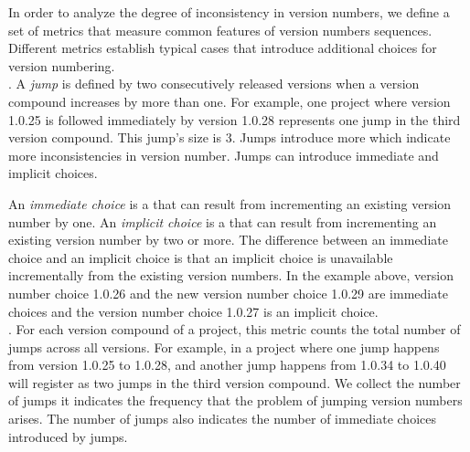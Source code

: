 \documentclass[conference]{IEEEtran}
\begin{document}
In order to analyze the degree of inconsistency in version numbers, we define 
a set of metrics that measure common features of version numbers sequences. Different metrics establish typical cases that introduce additional choices for version numbering. \\
 
 
 
 
. A \emph{jump} is defined by two consecutively released versions when a version compound increases by more than one.
For example, one project where version 1.0.25 is followed immediately by version 1.0.28 represents one jump in the third version compound. This jump's size is 3. Jumps introduce more \choices which indicate more inconsistencies in version number. 
Jumps can introduce immediate and implicit choices.

An \emph{immediate choice} is a \choice that can result from incrementing an existing version number by one. 
An \emph{implicit choice} is a \choice that can result from incrementing an existing version number by two or more.
The difference between an immediate choice and an implicit choice is that an implicit choice is unavailable incrementally from the existing version numbers. 
In the example above, version number choice 1.0.26 and the new version number choice 1.0.29 are immediate choices and the version number choice 1.0.27 is an implicit choice.
\\
 
.  For each version compound of a project, this metric counts the total number of jumps across all versions. For example, in a project where one jump happens from version 1.0.25 to 1.0.28, and another jump happens from 1.0.34 to 1.0.40 will register as two jumps in the third version compound.
We collect the number of jumps it indicates the frequency that the problem of jumping version numbers arises. 
The number of jumps also indicates the number of immediate choices introduced by jumps.\\
\end{document}
